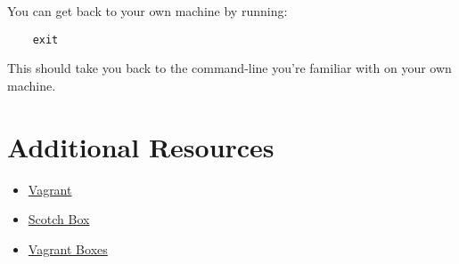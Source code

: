 You can get back to your own machine by running:

\begin{verbatim}
    exit
\end{verbatim}

This should take you back to the command-line you're familiar with on your own machine.

\section{Additional Resources}

\begin{itemize}[leftmargin=*]
    \item \href{https://www.vagrantup.com}{Vagrant}
    \item \href{https://box.scotch.io}{Scotch Box}
    \item \href{https://app.vagrantup.com/boxes/search}{Vagrant Boxes}
\end{itemize}